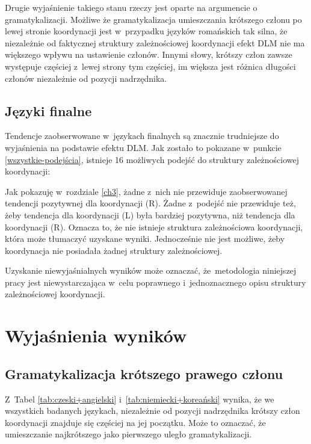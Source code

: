 Drugie wyjaśnienie takiego stanu rzeczy jest oparte na argumencie o gramatykalizacji. Możliwe że gramatykalizacja umieszczania krótszego członu po lewej stronie koordynacji jest w~przypadku języków romańskich tak silna, że niezależnie od faktycznej struktury zależnościowej koordynacji efekt DLM nie ma większego wpływu na ustawienie członów. Innymi słowy, krótszy człon zawsze występuje częściej z~lewej strony tym częściej, im większa jest różnica długości członów niezależnie od pozycji nadrzędnika.

\subsection{Języki finalne}

Tendencje zaobserwowane w~językach finalnych są znacznie trudniejsze do wyjaśnienia na podstawie efektu DLM. Jak zostało to pokazane w~punkcie \ref{wszystkie-podejścia}, istnieje 16 możliwych podejść do struktury zależnościowej koordynacji:



Jak pokazuję w~rozdziale \ref{ch3}, żadne z~nich nie przewiduje zaobserwowanej tendencji pozytywnej dla koordynacji (R). Żadne z~podejść nie przewiduje też, żeby tendencja dla koordynacji (L) była bardziej pozytywna, niż tendencja dla koordynacji (R). Oznacza to, że nie istnieje struktura zależnościowa koordynacji, która może tłumaczyć uzyskane wyniki. Jednocześnie nie jest możliwe, żeby koordynacja nie posiadała żadnej struktury zależnościowej. 

Uzyskanie niewyjaśnialnych wyników może oznaczać, że~metodologia niniejszej pracy jest niewystarczająca w~celu poprawnego i~jednoznacznego opisu struktury zależnościowej koordynacji.

\section{Wyjaśnienia wyników}

\subsection{Gramatykalizacja krótszego prawego członu} \label{gramatykalizacja}

Z~Tabel \ref{tab:czeski+angielski} i~\ref{tab:niemiecki+koreański} wynika, że we wszystkich badanych językach, niezależnie od pozycji nadrzędnika krótszy człon koordynacji znajduje się częściej na jej początku. Może to oznaczać, że umieszczanie najkrótszego jako pierwszego uległo gramatykalizacji.

